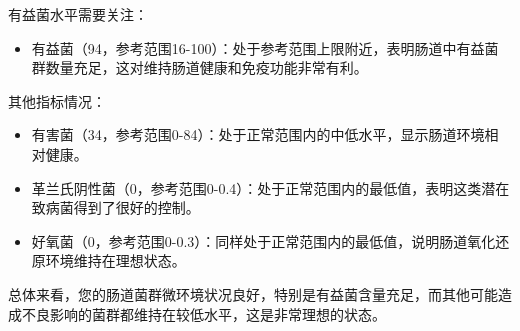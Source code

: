 \documentclass[UTF8]{ctexart}
\begin{document}
\begin{center}
\end{center}

\begin{tcolorbox}[
enhanced,
colback=gray!3,
colframe=gray!3,
arc=3mm,
boxrule=0pt,
width=\textwidth,
top=8pt,
bottom=8pt
]
{\small{\textcolor{customRed}{\faBell}}\quad 有益菌水平需要关注：
\begin{itemize}
\item 有益菌（94，参考范围16-100）：处于参考范围上限附近，表明肠道中有益菌群数量充足，这对维持肠道健康和免疫功能非常有利。
\end{itemize}

{\textcolor{green!85!orange}{\faBell}}\quad 其他指标情况：
\begin{itemize}
\item 有害菌（34，参考范围0-84）：处于正常范围内的中低水平，显示肠道环境相对健康。
\item 革兰氏阴性菌（0，参考范围0-0.4）：处于正常范围内的最低值，表明这类潜在致病菌得到了很好的控制。
\item 好氧菌（0，参考范围0-0.3）：同样处于正常范围内的最低值，说明肠道氧化还原环境维持在理想状态。
\end{itemize}

总体来看，您的肠道菌群微环境状况良好，特别是有益菌含量充足，而其他可能造成不良影响的菌群都维持在较低水平，这是非常理想的状态。
}
\end{tcolorbox}
\end{document}
